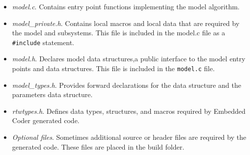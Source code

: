 \begin{itemize} %
\item \emph{model.c}. Contains entry point functions implementing the model algorithm.
\item \emph{model\_private.h}. Contains local macros and local data that are required by the model and subsystems. This file is included in the model.c file as a \verb|#include| statement.
\item \emph{model.h}. Declares model data structures,a public interface to the model
entry points and data structures. This file is included in the \verb|model.c| file.
\item \emph{model\_types.h}. Provides forward declarations for the data structure and the parameters data structure.
\item \emph{rtwtypes.h}. Defines data types, structures, and macros required by Embedded Coder generated code.
\item \emph{Optional files}. Sometimes additional source or header files are required by the generated code. These files are placed in the build folder.
\end{itemize}

